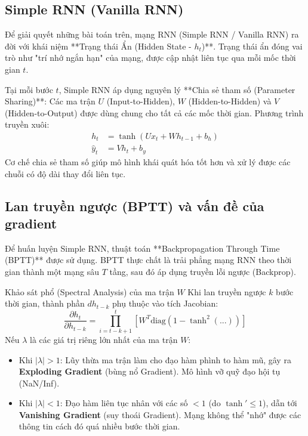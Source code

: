 \documentclass[12pt,a4paper]{article}
\begin{document}
\subsection{Simple RNN (Vanilla RNN)}
Để giải quyết những bài toán trên, mạng RNN (Simple RNN / Vanilla RNN) ra đời với khái niệm **Trạng thái Ẩn (Hidden State - $h_t$)**. Trạng thái ẩn đóng vai trò như "trí nhớ ngắn hạn" của mạng, được cập nhật liên tục qua mỗi mốc thời gian $t$.

Tại mỗi bước $t$, Simple RNN áp dụng nguyên lý **Chia sẻ tham số (Parameter Sharing)**: Các ma trận $U$ (Input-to-Hidden), $W$ (Hidden-to-Hidden) và $V$ (Hidden-to-Output) được dùng chung cho tất cả các mốc thời gian. 
Phương trình truyền xuôi:
\begin{align}
    h_t &= \tanh(U x_t + W h_{t-1} + b_h) \\
    \hat{y}_t &= V h_t + b_y
\end{align}
Cơ chế chia sẻ tham số giúp mô hình khái quát hóa tốt hơn và xử lý được các chuỗi có độ dài thay đổi liên tục.

\subsection{Lan truyền ngược (BPTT) và vấn đề của gradient}
Để huấn luyện Simple RNN, thuật toán **Backpropagation Through Time (BPTT)** được sử dụng. BPTT thực chất là trải phẳng mạng RNN theo thời gian thành một mạng sâu $T$ tầng, sau đó áp dụng truyền lỗi ngược (Backprop).

\begin{mybox}{Khảo sát phổ (Spectral Analysis) của ma trận $W$}
Khi lan truyền ngược $k$ bước thời gian, thành phần $dh_{t-k}$ phụ thuộc vào tích Jacobian:
\begin{equation}
    \frac{\partial h_t}{\partial h_{t-k}} = \prod_{i=t-k+1}^{t} \left[ W^T \text{diag}(1 - \tanh^2(...)) \right]
\end{equation}
Nếu $\lambda$ là các giá trị riêng lớn nhất của ma trận $W$:
\begin{itemize}
    \item Khi $\vert{}\lambda\vert{} > 1$: Lũy thừa ma trận làm cho đạo hàm phình to hàm mũ, gây ra \textbf{Exploding Gradient} (bùng nổ Gradient). Mô hình vỡ quỹ đạo hội tụ (NaN/Inf).
    \item Khi $\vert{}\lambda\vert{} < 1$: Đạo hàm liên tục nhân với các số $< 1$ (do $\tanh' \le 1$), dẫn tới \textbf{Vanishing Gradient} (suy thoái Gradient). Mạng không thể "nhớ" được các thông tin cách đó quá nhiều bước thời gian.
\end{itemize}
\end{mybox}
\end{document}
